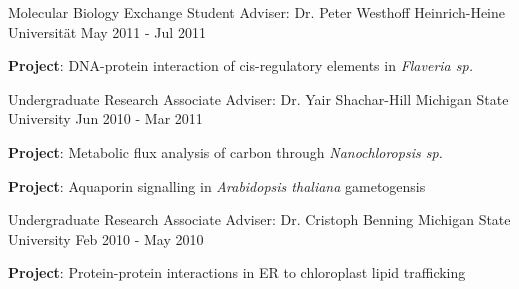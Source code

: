 \begin{cventries}
  \cventry
    {Molecular Biology Exchange Student} %
    {Adviser: Dr. Peter Westhoff} %
    {Heinrich-Heine Universit{\"a}t} %
    {May 2011 - Jul 2011} %
    {
      \begin{cvitems} %
        \item {\textbf{Project}: DNA-protein interaction of cis-regulatory elements in \textit{Flaveria sp.}}
      \end{cvitems}
    }
    
  \cventry
    {Undergraduate Research Associate} %
    {Adviser: Dr. Yair Shachar-Hill} %
    {Michigan State University} %
    {Jun 2010 - Mar 2011} %
    {
      \begin{cvitems} %
        \item {\textbf{Project}: Metabolic flux analysis of carbon through \textit{Nanochloropsis sp.}}
        \item {\textbf{Project}: Aquaporin signalling in \textit{Arabidopsis thaliana} gametogensis}
      \end{cvitems}
    }

  \cventry
    {Undergraduate Research Associate} %
    {Adviser: Dr. Cristoph Benning} %
    {Michigan State University} %
    {Feb 2010 - May 2010} %
    {
      \begin{cvitems} %
        \item {\textbf{Project}: Protein-protein interactions in ER to chloroplast lipid trafficking}
      \end{cvitems}
    }
    
\vspace{-4.0mm}
\end{cventries}
